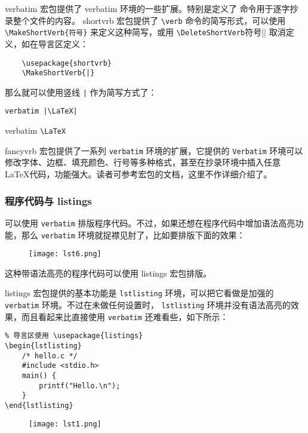 verbatim 宏包提供了 verbatim 环境的一些扩展。特别是定义了 \verb|| 命令用于逐字抄录整个文件的内容。 shortvrb 宏包提供了 \verb|\verb| 命令的简写形式，可以使用\verb|\MakeShortVerb{符号}| 来定义这种简写，或用 \verb|\DeleteShortVerb|符号|| 取消定义，如在导言区定义：
\begin{lstlisting}
    \usepackage{shortvrb}
    \MakeShortVerb{|}
\end{lstlisting}
那么就可以使用竖线 \lstinline{|} 作为简写方式了：

\begin{minipage}[t]{0.45\textwidth}
\begin{lstlisting}
verbatim |\LaTeX|
\end{lstlisting}
\end{minipage}
\hfill
\begin{minipage}[t]{0.45\textwidth}
    verbatim \verb|\LaTeX|
\end{minipage}

fancyvrb 宏包提供了一系列 \verb|verbatim| 环境的扩展，它提供的 \verb|Verbatim| 环境可以修改字体、边框、填充颜色、行号等多种格式，甚至在抄录环境中插入任意 \LaTeX 代码，功能强大。读者可参考宏包的文档，这里不作详细介绍了。

\subsubsection{程序代码与 listings}

可以使用 \verb|verbatim| 排版程序代码。不过，如果还想在程序代码中增加语法高亮功能，那么 \verb|verbatim| 环境就捉襟见肘了，比如要排版下面的效果：
\begin{figure}[H]
    \centering
    \texttt{[image: lst6.png]}
\end{figure}

这种带语法高亮的程序代码可以使用 listings 宏包排版。

listings 宏包提供的基本功能是 \verb|lstlisting| 环境，可以把它看做是加强的 \verb|verbatim| 环境。不过在未做任何设置时， \verb|lstlisting| 环境并没有语法高亮的效果，而且看起来比直接使用 \verb|verbatim| 还难看些，如下所示：

\begin{minipage}[t]{0.45\textwidth}
\vspace{0.1cm}
\begin{verbatim}
% 导言区使用 \usepackage{listings}
\begin{lstlisting}
    /* hello.c */
    #include <stdio.h>
    main() {
        printf("Hello.\n");
    }
\end{lstlisting}
\end{verbatim}

\end{minipage}
\hfill
\begin{minipage}[t]{0.45\textwidth}
\begin{figure}[H]
    \centering
    \texttt{[image: lst1.png]}
\end{figure}
\end{minipage}

